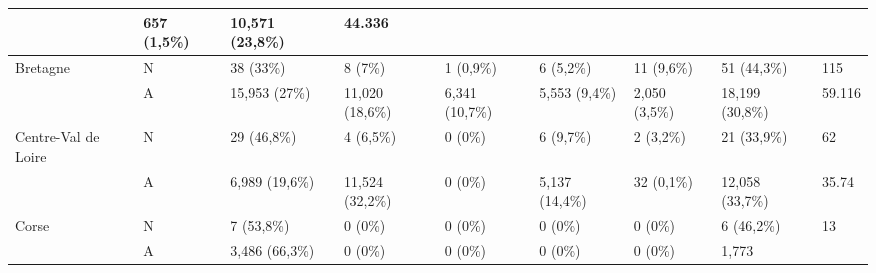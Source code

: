 \begin{table}[h!]
{\begin{tabular}{|l|l|l|l|l|l|l|l|l|}
                                                              & 657 (1,5\%)     & 10,571 (23,8\%)                             & 44.336                                                                   \\ \hline
            Bretagne                                          & N               & 38 (33\%)                                   & 8 (7\%)         & 1 (0,9\%)        & 6 (5,2\%)      & 11 (9,6\%)
                                                              & 51 (44,3\%)     & 115                                                                                                                    \\
            ~                                                 & A               & 15,953 (27\%)                               & 11,020 (18,6\%) & 6,341 (10,7\%)   & 5,553 (9,4\%)
                                                              & 2,050 (3,5\%)   & 18,199 (30,8\%)                             & 59.116                                                                   \\ \hline
            Centre-Val de Loire                               & N               & 29 (46,8\%)                                 & 4 (6,5\%)       & 0 (0\%)          & 6 (9,7\%)
                                                              & 2 (3,2\%)       & 21 (33,9\%)                                 & 62                                                                       \\
            ~                                                 & A               & 6,989 (19,6\%)                              & 11,524 (32,2\%) & 0 (0\%)          & 5,137 (14,4\%) & 32
            (0,1\%)                                           & 12,058 (33,7\%) & 35.74                                                                                                                  \\ \hline
            Corse                                             & N               & 7 (53,8\%)                                  & 0 (0\%)         & 0 (0\%)          & 0 (0\%)        & 0 (0\%)    & 6
            (46,2\%)                                          & 13                                                                                                                                       \\
            ~                                                 & A               & 3,486 (66,3\%)                              & 0 (0\%)         & 0 (0\%)          & 0 (0\%)        & 0 (0\%)    & 1,773

\end{tabular}}
\end{table}
